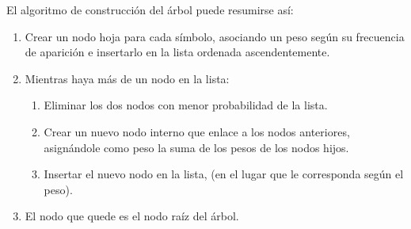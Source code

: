 \documentclass[12pt,twoside]{article}
\begin{document}
El algoritmo de construcción del árbol puede resumirse así:
\begin{enumerate}  
\item Crear un nodo hoja para cada s\'imbolo, asociando un peso seg\'un su frecuencia de aparici\'on e insertarlo en la lista ordenada ascendentemente.
\item Mientras haya m\'as de un nodo en la lista:
\begin{enumerate}  
\item Eliminar los dos nodos con menor probabilidad de la lista.
\item Crear un nuevo nodo interno que enlace a los nodos anteriores, asign\'andole como peso la suma de los pesos de los nodos hijos.
\item Insertar el nuevo nodo en la lista, (en el lugar que le corresponda seg\'un el peso).
\end{enumerate}
\item El nodo que quede es el nodo ra\'iz del \'arbol.
\end{enumerate}
\end{document}
